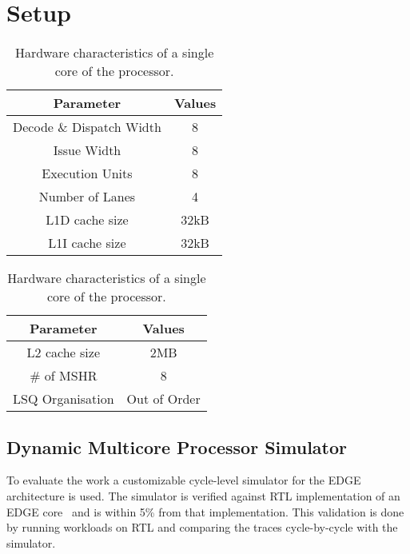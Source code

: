 \chapter{Setup}\label{chp:setup}

\begin{table}[ht]
\begin{minipage}{0.5\textwidth}
\begin{singlespace}
\begin{tabular} { cc }
      \toprule
      \textbf{Parameter} & \textbf{Values} \\ \midrule
	  Decode \& Dispatch Width & 8  \\
	  Issue Width & 8  \\
	  Execution Units & 8 \\
	  Number of Lanes & 4 \\
      L1D cache size & 32kB \\
      L1I cache size & 32kB \\
	  
	  \end{tabular}
	  \end{singlespace}
\end{minipage}\hfill
\begin{minipage}{0.5\textwidth}
\begin{singlespace}
\begin{tabular} {cc }
      \toprule
      \textbf{Parameter} & \textbf{Values} \\ \midrule
L2 cache size & 2MB \\
	  \# of MSHR & 8 \\
	  LSQ Organisation & Out of Order \\
	  
	  \end{tabular}
	  \end{singlespace}
\end{minipage}
\caption{Hardware characteristics of a single core of the processor.}\label{tab:processor}
\vspace{-3em}
\end{table}

\section{Dynamic Multicore Processor Simulator}\label{chp:setup:conf}

To evaluate the work a customizable cycle-level simulator for the EDGE architecture is used.
The simulator is verified against RTL implementation of an EDGE core~\cite{putnam2010e2,gray2018edge} and is within 5\% from that implementation.
This validation is done by running workloads on RTL and comparing the traces cycle-by-cycle with the simulator.

